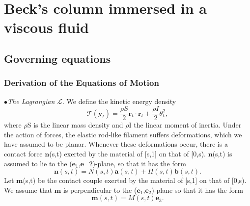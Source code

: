 \documentclass[12pt]{article}
\begin{document}
\section{Beck’s column immersed in a viscous fluid}
\subsection{Governing equations}\label{Governing equations}
\subsubsection{Derivation of the Equations of Motion}
$\bullet$\emph{The Lagrangian $\mathcal{L}$}. We define the kinetic energy density 
\[ \mathcal{T}(\mathbf{y}_t) = \frac{\rho S}{2} \mathbf{r}_t \cdot \mathbf{r}_t + \frac{\rho I}{2}\theta_t ^2,
\]
where $\rho$S is the linear mass density and $\rho$I the linear moment of inertia.
Under the action of forces, the elastic rod-like filament suffers deformations, which we have assumed to be planar. Whenever these deformations occur, there is a contact force
$\mathbf{n}$(s,t) exerted by the material of [s,1] on that of [0,s). $\mathbf{n}$(s,t) is assumed to lie to the ($\mathbf{e}_1$,$\mathbf{e}$_2)-plane, so that it has the form
\[  \mathbf{n}(s,t)= N(s,t) \mathbf{a}(s,t) + H(s,t)\mathbf{b} (s,t).
\]
Let $\mathbf{m}$(s,t) be the contact couple exerted by the material of [s,1] on that of [0,s). We assume that $\mathbf{m}$ is perpendicular to the ($\mathbf{e}_1$,$\mathbf{e}_2$)-plane so that it has the form
\[ 
\mathbf{m}(s,t) = M(s,t)\mathbf{e}_3.
\]
\end{document}
